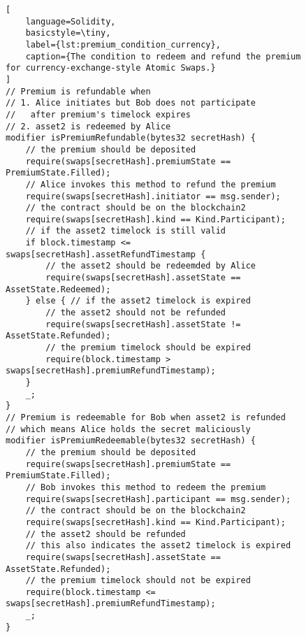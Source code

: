 \begin{figure}[htb]
\begin{lstlisting}[
    language=Solidity, 
    basicstyle=\tiny,
    label={lst:premium_condition_currency},
    caption={The condition to redeem and refund the premium for currency-exchange-style Atomic Swaps.}
]
// Premium is refundable when
// 1. Alice initiates but Bob does not participate
//   after premium's timelock expires
// 2. asset2 is redeemed by Alice
modifier isPremiumRefundable(bytes32 secretHash) {
    // the premium should be deposited
    require(swaps[secretHash].premiumState == PremiumState.Filled);
    // Alice invokes this method to refund the premium
    require(swaps[secretHash].initiator == msg.sender);
    // the contract should be on the blockchain2
    require(swaps[secretHash].kind == Kind.Participant);
    // if the asset2 timelock is still valid
    if block.timestamp <= swaps[secretHash].assetRefundTimestamp {
        // the asset2 should be redeemded by Alice
        require(swaps[secretHash].assetState == AssetState.Redeemed);
    } else { // if the asset2 timelock is expired
        // the asset2 should not be refunded
        require(swaps[secretHash].assetState != AssetState.Refunded);
        // the premium timelock should be expired
        require(block.timestamp > swaps[secretHash].premiumRefundTimestamp);
    }
    _;
}
// Premium is redeemable for Bob when asset2 is refunded
// which means Alice holds the secret maliciously
modifier isPremiumRedeemable(bytes32 secretHash) {
    // the premium should be deposited
    require(swaps[secretHash].premiumState == PremiumState.Filled);
    // Bob invokes this method to redeem the premium
    require(swaps[secretHash].participant == msg.sender);
    // the contract should be on the blockchain2
    require(swaps[secretHash].kind == Kind.Participant);
    // the asset2 should be refunded
    // this also indicates the asset2 timelock is expired
    require(swaps[secretHash].assetState == AssetState.Refunded);
    // the premium timelock should not be expired
    require(block.timestamp <= swaps[secretHash].premiumRefundTimestamp);
    _;
}
\end{lstlisting}
\end{figure}

